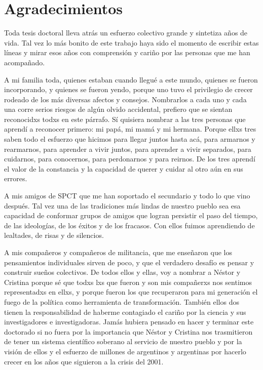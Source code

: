 \chapter*{Agradecimientos}
Toda tesis doctoral lleva atrás un esfuerzo colectivo grande y sintetiza años de vida. Tal vez lo más bonito de este trabajo haya sido el momento de escribir estas líneas y mirar esos años con comprensión y cariño por las personas que me han acompañado.

A mi familia toda, quienes estaban cuando llegué a este mundo, quienes se fueron incorporando, y quienes se fueron yendo, porque uno tuvo el privilegio de crecer rodeado de los más diversas afectos y consejos. Nombrarlos a cada uno y cada una corre serios riesgos de algún olvido accidental, prefiero que se sientan reconocidxs todxs en este párrafo. Sí quisiera nombrar a las tres personas que aprendí a reconocer primero: mi papá, mi mamá y mi hermana. Porque ellxs tres saben todo el esfuerzo que hicimos para llegar juntos hasta acá, para armarnos y rearmarnos, para aprender a vivir juntos, para aprender a vivir separados, para cuidarnos, para conocernos, para perdonarnos y para reirnos. De los tres aprendí el valor de la constancia y la capacidad de querer y cuidar al otro aún en sus errores. 

A mis amigos de SPCT que me han soportado el secundario y todo lo que vino después. Tal vez una de las tradiciones más lindas de nuestro pueblo sea esa capacidad de conformar grupos de amigos que logran persistir el paso del tiempo, de las ideologías, de los éxitos y de los fracasos. Con ellos fuimos aprendiendo de lealtades, de risas y de silencios.

A mis compañeros y compañeros de militancia, que me enseñaron que los pensamientos individuales sirven de poco, y que el verdadero desafío es pensar y construir sueños colectivos. De todos ellos y ellas, voy a nombrar a Néstor y Cristina porque sé que todxs lxs que fueron y son mis compañerxs nos sentimos representadxs en ellxs, y porque fueron los que recuperaron para mi generación el fuego de la política como herramienta de transformación. También ellos dos tienen la responsabilidad de haberme contagiado el cariño por la ciencia y sus investigadores e investigadoras. Jamás hubiera pensado en hacer y terminar este doctorado si no fuera por la importancia que Néstor y Cristina nos trasmitieron de tener un sistema científico soberano al servicio de nuestro pueblo y por la visión de ellos y el esfuerzo de millones de argentinos y argentinas por hacerlo crecer en los años que siguieron a la crisis del 2001.

